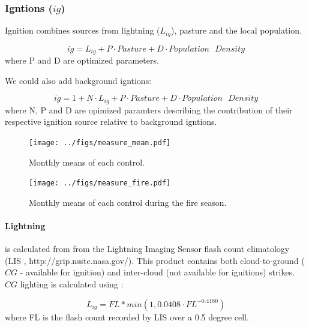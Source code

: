 \subsubsection{Igntions ($ig$)}

Ignition combines sources from lightning ($L_{ig}$), pasture and the local population.

\begin{equation}
    ig = L_{ig} + P \cdot Pasture + D \cdot Population\text{ }Density
\end{equation}
where P and D are optimized parameters.

\begin{shaded}
    We could also add background igntions:

    \begin{equation}
        ig = 1 + N \cdot L_{ig} + P \cdot Pasture + D \cdot Population\text{ }Density
    \end{equation}
    where N, P and D are opimized paramters describing the contribution of their respective ignition source relative to background igntions.
\end{shaded}


\begin{figure}[!ht]
  \centering
    \texttt{[image: ../figs/measure\_mean.pdf]}
  \caption{Monthly means of each control. }
  \label{fig:Monthly_mean_controls}
\end{figure}

\begin{figure}[!ht]
  \centering
    \texttt{[image: ../figs/measure\_fire.pdf]}
  \caption{Monthly means of each control during the fire season. }
  \label{fig:Season_mean_controls}
\end{figure}

\paragraph{Lightning}
is calculated from
from the Lightning Imaging Sensor flash count climatology (LIS \cite{christian1999lightning}, http://grip.nsstc.nasa.gov/). 
This product contains both cloud-to-ground ($CG$ - available for ignition) and inter-cloud (not available for ignitions) strikes.
$CG$ lighting is calculated using \citet{kelley2014improved}:

\begin{equation}
    L_{ig} = FL * min(1, 0.0408 \cdot FL^{-0.4180})
\end{equation}
where FL is the flash count recorded by LIS over a 0.5 degree cell.


